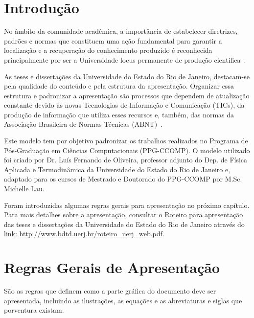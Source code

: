 



\chapter*{Introdução} %

No âmbito da comunidade acadêmica, a importância de estabelecer diretrizes, padrões e normas que constituem uma ação fundamental para garantir a localização e a recuperação do conhecimento produzido é reconhecida principalmente por ser a Universidade locus permanente de produção científica~\cite{bib:roteiro}.

As teses e dissertações da Universidade do Estado do Rio de Janeiro, destacam-se pela qualidade do conteúdo e pela estrutura da apresentação. Organizar essa estrutura e padronizar a apresentação são processos que dependem de atualização constante devido às novas Tecnologias de Informação e Comunicação (TICs), da produção de informação que utiliza esses recursos e, também, das normas da Associação Brasileira de Normas Técnicas (ABNT)~\cite{bib:roteiro}.

Este modelo tem por objetivo padronizar os trabalhos realizados no Programa de Pós-Graduação em Ciências Computacionais (PPG-CCOMP). O modelo utilizado foi criado por Dr. Luís Fernando de Oliveira, professor adjunto do Dep. de Física Aplicada e Termodinâmica da Universidade do Estado do Rio de Janeiro e, adaptado para os cursos de Mestrado e Doutorado do PPG-CCOMP por M.Sc. Michelle Lau.

Foram introduzidas algumas regras gerais para apresentação no próximo capítulo. Para mais detalhes sobre a apresentação, consultar o Roteiro para apresentação das teses e dissertações da Universidade do Estado do Rio de Janeiro através do link: \url{http://www.bdtd.uerj.br/roteiro_uerj_web.pdf}.


\chapter{Regras Gerais de Apresentação}

São as regras que definem como a parte gráfica do documento
deve ser apresentada, incluindo as ilustrações, as equações e as abreviaturas e siglas que porventura existam.


